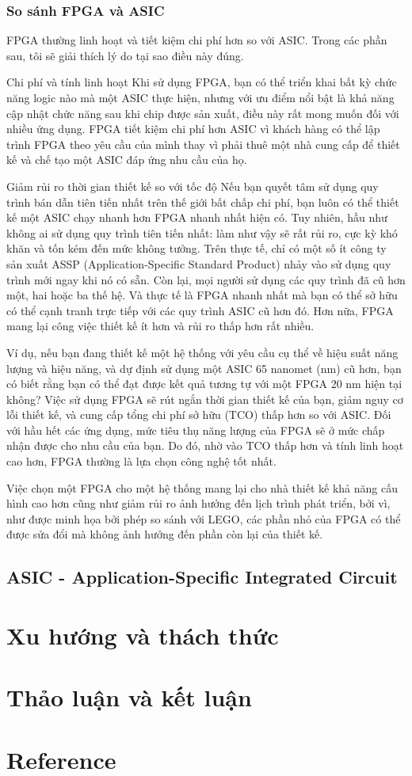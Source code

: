 \documentclass[a4paper]{article}
\begin{document}
\subsubsection{So sánh FPGA và ASIC}
FPGA thường linh hoạt và tiết kiệm chi phí hơn so với ASIC. Trong các phần sau, tôi sẽ giải thích lý do tại sao điều này đúng.

Chi phí và tính linh hoạt
Khi sử dụng FPGA, bạn có thể triển khai bất kỳ chức năng logic nào mà một ASIC thực hiện, nhưng với ưu điểm nổi bật là khả năng cập nhật chức năng sau khi chip được sản xuất, điều này rất mong muốn đối với nhiều ứng dụng. FPGA tiết kiệm chi phí hơn ASIC vì khách hàng có thể lập trình FPGA theo yêu cầu của mình thay vì phải thuê một nhà cung cấp để thiết kế và chế tạo một ASIC đáp ứng nhu cầu của họ.

Giảm rủi ro thời gian thiết kế so với tốc độ
Nếu bạn quyết tâm sử dụng quy trình bán dẫn tiên tiến nhất trên thế giới bất chấp chi phí, bạn luôn có thể thiết kế một ASIC chạy nhanh hơn FPGA nhanh nhất hiện có. Tuy nhiên, hầu như không ai sử dụng quy trình tiên tiến nhất: làm như vậy sẽ rất rủi ro, cực kỳ khó khăn và tốn kém đến mức không tưởng. Trên thực tế, chỉ có một số ít công ty sản xuất ASSP (Application-Specific Standard Product) nhảy vào sử dụng quy trình mới ngay khi nó có sẵn. Còn lại, mọi người sử dụng các quy trình đã cũ hơn một, hai hoặc ba thế hệ. Và thực tế là FPGA nhanh nhất mà bạn có thể sở hữu có thể cạnh tranh trực tiếp với các quy trình ASIC cũ hơn đó. Hơn nữa, FPGA mang lại công việc thiết kế ít hơn và rủi ro thấp hơn rất nhiều.

Ví dụ, nếu bạn đang thiết kế một hệ thống với yêu cầu cụ thể về hiệu suất năng lượng và hiệu năng, và dự định sử dụng một ASIC 65 nanomet (nm) cũ hơn, bạn có biết rằng bạn có thể đạt được kết quả tương tự với một FPGA 20 nm hiện tại không? Việc sử dụng FPGA sẽ rút ngắn thời gian thiết kế của bạn, giảm nguy cơ lỗi thiết kế, và cung cấp tổng chi phí sở hữu (TCO) thấp hơn so với ASIC. Đối với hầu hết các ứng dụng, mức tiêu thụ năng lượng của FPGA sẽ ở mức chấp nhận được cho nhu cầu của bạn. Do đó, nhờ vào TCO thấp hơn và tính linh hoạt cao hơn, FPGA thường là lựa chọn công nghệ tốt nhất.

Việc chọn một FPGA cho một hệ thống mang lại cho nhà thiết kế khả năng cấu hình cao hơn cũng như giảm rủi ro ảnh hưởng đến lịch trình phát triển, bởi vì, như được minh họa bởi phép so sánh với LEGO, các phần nhỏ của FPGA có thể được sửa đổi mà không ảnh hưởng đến phần còn lại của thiết kế.
\subsection{ASIC - Application-Specific Integrated Circuit}
\section{Xu hướng và thách thức}
\section{Thảo luận và kết luận}
\section{Reference}
\end{document}
